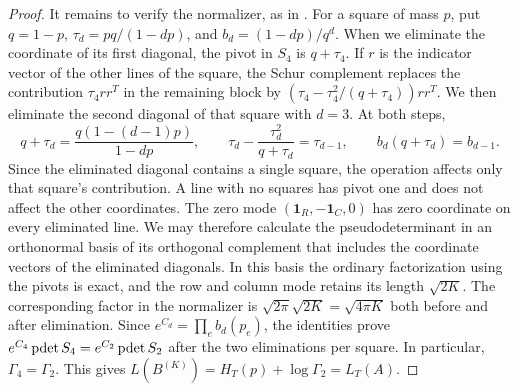 \begin{proof}
It remains to verify the normalizer, as in \cite[Section~8.1]{pred}. For a square of mass $p$,
put $q=1-p$, $\tau_d=pq/(1-dp)$, and $b_d=(1-dp)/q^d$. When we eliminate the coordinate of its
first diagonal, the pivot in $S_4$ is $q+\tau_4$. If $r$ is the indicator vector of the other lines
of the square,
the Schur complement replaces the contribution $\tau_4rr^T$ in the remaining block by
$(\tau_4-\tau_4^2/(q+\tau_4))rr^T$. We then eliminate the second diagonal of that square with
$d=3$. At both steps,
\[
 q+\tau_d=\frac{q(1-(d-1)p)}{1-dp},\qquad
 \tau_d-\frac{\tau_d^2}{q+\tau_d}=\tau_{d-1},\qquad
 b_d(q+\tau_d)=b_{d-1}.
\]
Since the eliminated diagonal contains a single square, the operation affects only that square's
contribution. A line with no squares has pivot one and does not affect the other coordinates.
The zero mode $(\mathbf1_R,-\mathbf1_C,0)$ has zero coordinate on every eliminated line. We may
therefore calculate the pseudodeterminant in an orthonormal basis of its orthogonal complement
that includes the coordinate vectors of the eliminated diagonals. In this basis the ordinary
factorization using the pivots is exact, and the row and column mode retains its length
$\sqrt{2K}$. The corresponding factor in the normalizer is $\sqrt{2\pi}\sqrt{2K}=\sqrt{4\pi K}$
both before and after elimination. Since $e^{C_d}=\prod_e b_d(p_e)$, the identities prove
$e^{C_4}\operatorname{pdet} S_4=e^{C_2}\operatorname{pdet} S_2$ after the two eliminations per square. In particular,
$\Gamma_4=\Gamma_2$. This gives $L(B^{(K)})=H_T(p)+\log\Gamma_2=L_T(A)$.
\end{proof}
